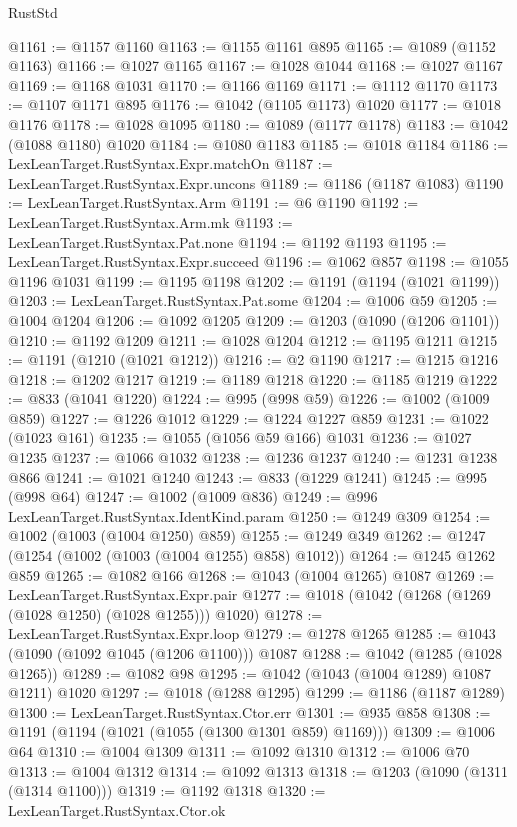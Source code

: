 \begin{lexlean}{RustStd}
\begin{coremodule}
@1161 := @1157 @1160
@1163 := @1155 @1161 @895
@1165 := @1089 (@1152 @1163)
@1166 := @1027 @1165
@1167 := @1028 @1044
@1168 := @1027 @1167
@1169 := @1168 @1031
@1170 := @1166 @1169
@1171 := @1112 @1170
@1173 := @1107 @1171 @895
@1176 := @1042 (@1105 @1173) @1020
@1177 := @1018 @1176
@1178 := @1028 @1095
@1180 := @1089 (@1177 @1178)
@1183 := @1042 (@1088 @1180) @1020
@1184 := @1080 @1183
@1185 := @1018 @1184
@1186 := LexLeanTarget.RustSyntax.Expr.matchOn
@1187 := LexLeanTarget.RustSyntax.Expr.uncons
@1189 := @1186 (@1187 @1083)
@1190 := LexLeanTarget.RustSyntax.Arm
@1191 := @6 @1190
@1192 := LexLeanTarget.RustSyntax.Arm.mk
@1193 := LexLeanTarget.RustSyntax.Pat.none
@1194 := @1192 @1193
@1195 := LexLeanTarget.RustSyntax.Expr.succeed
@1196 := @1062 @857
@1198 := @1055 @1196 @1031
@1199 := @1195 @1198
@1202 := @1191 (@1194 (@1021 @1199))
@1203 := LexLeanTarget.RustSyntax.Pat.some
@1204 := @1006 @59
@1205 := @1004 @1204
@1206 := @1092 @1205
@1209 := @1203 (@1090 (@1206 @1101))
@1210 := @1192 @1209
@1211 := @1028 @1204
@1212 := @1195 @1211
@1215 := @1191 (@1210 (@1021 @1212))
@1216 := @2 @1190
@1217 := @1215 @1216
@1218 := @1202 @1217
@1219 := @1189 @1218
@1220 := @1185 @1219
@1222 := @833 (@1041 @1220)
@1224 := @995 (@998 @59)
@1226 := @1002 (@1009 @859)
@1227 := @1226 @1012
@1229 := @1224 @1227 @859
@1231 := @1022 (@1023 @161)
@1235 := @1055 (@1056 @59 @166) @1031
@1236 := @1027 @1235
@1237 := @1066 @1032
@1238 := @1236 @1237
@1240 := @1231 @1238 @866
@1241 := @1021 @1240
@1243 := @833 (@1229 @1241)
@1245 := @995 (@998 @64)
@1247 := @1002 (@1009 @836)
@1249 := @996 LexLeanTarget.RustSyntax.IdentKind.param
@1250 := @1249 @309
@1254 := @1002 (@1003 (@1004 @1250) @859)
@1255 := @1249 @349
@1262 := @1247 (@1254 (@1002 (@1003 (@1004 @1255) @858) @1012))
@1264 := @1245 @1262 @859
@1265 := @1082 @166
@1268 := @1043 (@1004 @1265) @1087
@1269 := LexLeanTarget.RustSyntax.Expr.pair
@1277 := @1018 (@1042 (@1268 (@1269 (@1028 @1250) (@1028 @1255))) @1020)
@1278 := LexLeanTarget.RustSyntax.Expr.loop
@1279 := @1278 @1265
@1285 := @1043 (@1090 (@1092 @1045 (@1206 @1100))) @1087
@1288 := @1042 (@1285 (@1028 @1265))
@1289 := @1082 @98
@1295 := @1042 (@1043 (@1004 @1289) @1087 @1211) @1020
@1297 := @1018 (@1288 @1295)
@1299 := @1186 (@1187 @1289)
@1300 := LexLeanTarget.RustSyntax.Ctor.err
@1301 := @935 @858
@1308 := @1191 (@1194 (@1021 (@1055 (@1300 @1301 @859) @1169)))
@1309 := @1006 @64
@1310 := @1004 @1309
@1311 := @1092 @1310
@1312 := @1006 @70
@1313 := @1004 @1312
@1314 := @1092 @1313
@1318 := @1203 (@1090 (@1311 (@1314 @1100)))
@1319 := @1192 @1318
@1320 := LexLeanTarget.RustSyntax.Ctor.ok

\end{coremodule}
\end{lexlean}
